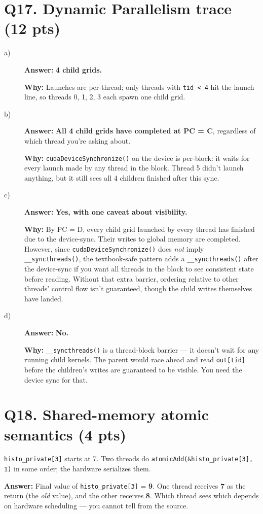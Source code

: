 \documentclass[11pt]{article}
\newcommand{\ans}[1]{\par\noindent\textcolor{anscolor}{\textbf{Answer:}} #1\par}
\newcommand{\why}[1]{\par\noindent\textcolor{anscolor}{\textbf{Why:}} #1\par\vspace{4pt}}
\begin{document}
\section*{Q17. Dynamic Parallelism trace (12 pts)}
\begin{description}
  \item[a)] \ans{\textbf{4 child grids.}}
        \why{Launches are per-thread; only threads with \texttt{tid < 4} hit the launch line, so
        threads 0, 1, 2, 3 each spawn one child grid.}
  \item[b)] \ans{\textbf{All 4 child grids have completed at PC = C}, regardless of which thread
        you're asking about.}
        \why{\texttt{cudaDeviceSynchronize()} on the device is per-block: it waits for every
        launch made by any thread in the block. Thread 5 didn't launch anything, but it still
        sees all 4 children finished after this sync.}
  \item[c)] \ans{\textbf{Yes, with one caveat about visibility.}}
        \why{By PC = D, every child grid launched by every thread has finished due to the
        device-sync. Their writes to global memory are completed. However, since
        \texttt{cudaDeviceSynchronize()} does \emph{not} imply \texttt{\_\_syncthreads()}, the
        textbook-safe pattern adds a \texttt{\_\_syncthreads()} after the device-sync if you
        want all threads in the block to see consistent state before reading. Without that
        extra barrier, ordering relative to other threads' control flow isn't guaranteed,
        though the child writes themselves have landed.}
  \item[d)] \ans{\textbf{No.}}
        \why{\texttt{\_\_syncthreads()} is a thread-block barrier — it doesn't wait for any
        running child kernels. The parent would race ahead and read \texttt{out[tid]} before
        the children's writes are guaranteed to be visible. You need the device sync for that.}
\end{description}

\section*{Q18. Shared-memory atomic semantics (4 pts)}
\texttt{histo\_private[3]} starts at 7. Two threads do \texttt{atomicAdd(\&histo\_private[3], 1)}
in some order; the hardware serializes them.
\ans{Final value of \texttt{histo\_private[3]} = \textbf{9}. One thread receives \textbf{7} as
the return (the \emph{old} value), and the other receives \textbf{8}. Which thread sees which
depends on hardware scheduling — you cannot tell from the source.}
\end{document}

